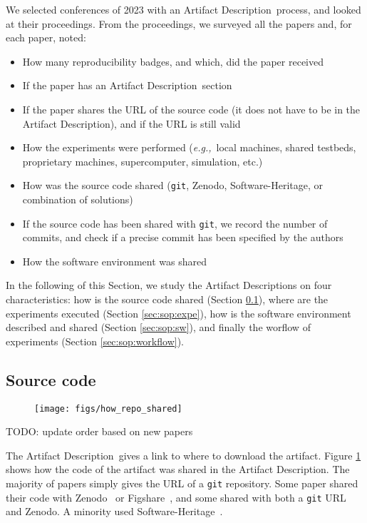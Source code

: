 \documentclass[sigconf]{acmart}
\newcommand{\eg}{\emph{e.g.,}}
\newcommand{\ad}{Artifact Description}
\newcommand{\todo}[1]{{\color{red}TODO: #1}}
\begin{document}
We selected conferences of 2023 with an \ad\ process, and looked at their proceedings.
From the proceedings, we surveyed all the papers and, for each paper, noted:

\begin{itemize}
  \item How many reproducibility badges, and which, did the paper received
  \item If the paper has an \ad\ section
  \item If the paper shares the URL of the source code (it does not have to be in the \ad), and if the URL is still valid
  \item How the experiments were performed (\eg\ local machines, shared testbeds, proprietary machines, supercomputer, simulation, etc.)
  \item How was the source code shared (\texttt{git}, Zenodo, Software-Heritage, or combination of solutions)
  \item If the source code has been shared with \texttt{git}, we record the number of commits, and check if a precise commit has been specified by the authors
  \item How the software environment was shared
\end{itemize}


In the following of this Section, we study the \ad s on four characteristics: how is the source code shared (Section \ref{sec:sop:src}), where are the experiments executed (Section \ref{sec:sop:expe}), how is the software environment described and shared (Section \ref{sec:sop:sw}), and finally the worflow of experiments (Section \ref{sec:sop:workflow}).

\subsection{Source code}\label{sec:sop:src}

\begin{figure}
  \centering
  \texttt{[image: figs/how\_repo\_shared]}
  \caption{}\label{fig:how_repo_shared}
\end{figure}

\todo{update order based on new papers}

The \ad\ gives a link to where to download the artifact.
Figure \ref{fig:how_repo_shared} shows how the code of the artifact was shared in the \ad.
The majority of papers simply gives the URL of a \texttt{git} repository.
Some paper shared their code with Zenodo\ \cite{zenodo} or Figshare\ \cite{figshare}, and some shared with both a \texttt{git} URL and Zenodo.
A minority used Software-Heritage\ \cite{swheritage}.
\end{document}

